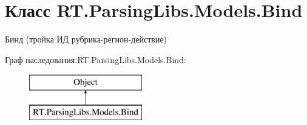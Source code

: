 \hypertarget{class_r_t_1_1_parsing_libs_1_1_models_1_1_bind}{\section{Класс R\+T.\+Parsing\+Libs.\+Models.\+Bind}
\label{class_r_t_1_1_parsing_libs_1_1_models_1_1_bind}
}


Бинд (тройка ИД рубрика-\/регион-\/действие)  


Граф наследования\+:R\+T.\+Parsing\+Libs.\+Models.\+Bind\+:\begin{figure}[H]
\begin{center}
\leavevmode
\includegraphics[height=2.000000cm]{class_r_t_1_1_parsing_libs_1_1_models_1_1_bind}
\end{center}
\end{figure}
